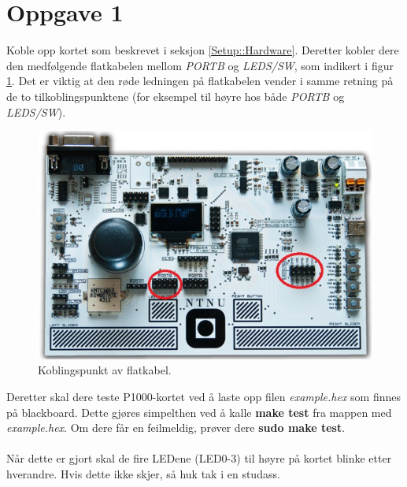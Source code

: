 \documentclass[11pt,a4paper]{article}
\def\e_learn_platform{blackboard}
\begin{document}
\section{Oppgave 1}
Koble opp kortet som beskrevet i seksjon \ref{Setup::Hardware}. Deretter kobler dere den medfølgende flatkabelen mellom \textit{PORTB} og \textit{LEDS/SW}, som indikert i figur \ref{PORTB::LEDS}. Det er viktig at den røde ledningen på flatkabelen vender i samme retning på de to tilkoblingspunktene (for eksempel til høyre hos både \textit{PORTB} og \textit{LEDS/SW}).
\begin{figure}[htb]
\centering
\includegraphics[width=0.8\linewidth]{portb_leds.png}
\caption{Koblingspunkt av flatkabel.}
\label{PORTB::LEDS}
\end{figure}
Deretter skal dere teste P1000-kortet ved å laste opp filen \textit{example.hex} som finnes på \e_learn_platform. Dette gjøres simpelthen ved å kalle \textbf{make test} fra mappen med \textit{example.hex}. Om dere får en feilmeldig, prøver dere \textbf{sudo make test}.\\
\\
Når dette er gjort skal de fire LEDene (LED0-3) til høyre på kortet blinke etter hverandre. Hvis dette ikke skjer, så huk tak i en studass.
\end{document}
